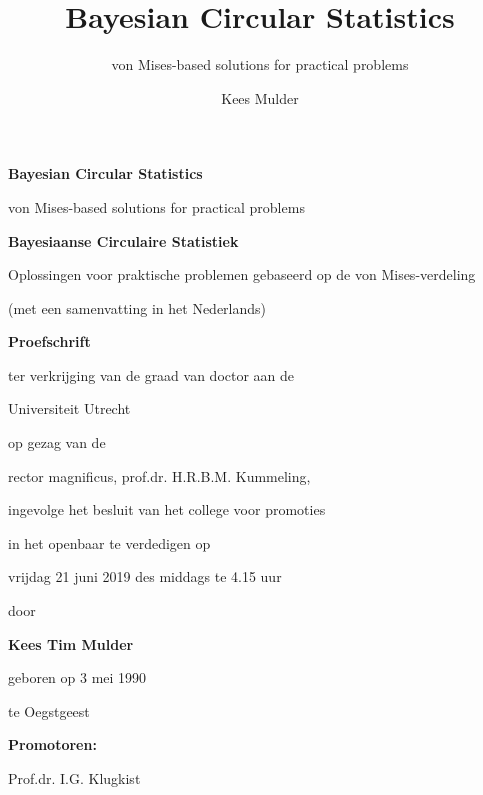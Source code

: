 \documentclass[12pt, a4paper]{book}\usepackage[]{graphicx}\usepackage{xcolor}
\title{Bayesian Circular Statistics}
\subtitle{von Mises-based solutions for practical problems}
\author{Kees Mulder}
\begin{document}
\frontmatter


\begin{center}
\huge{\textbf{Bayesian Circular Statistics}}

\Large{von Mises-based solutions for practical problems}

\vspace*{1cm}

\large{\textbf{Bayesiaanse Circulaire Statistiek}}

\normalsize{Oplossingen voor praktische problemen gebaseerd op de von Mises-verdeling}

\vspace*{.3cm}

\normalsize{(met een samenvatting in het Nederlands)}



\vspace*{2cm}

\Large{\textbf{Proefschrift}}

\vspace*{3cm}

\normalsize

ter verkrijging van de graad van doctor aan de

Universiteit Utrecht

op gezag van de

rector magnificus, prof.dr. H.R.B.M. Kummeling,

 ingevolge het besluit van het college voor promoties

in het openbaar te verdedigen op

\vspace*{.5cm}
vrijdag 21 juni 2019 des middags te 4.15 uur


\vspace*{1.5cm}

door


\vspace*{1.5cm}

\Large{\textbf{Kees Tim Mulder}}
\normalsize

\vspace*{1cm}

geboren op 3 mei 1990

te Oegstgeest

\end{center}


\newpage

\pagestyle{plain}
\textbf{Promotoren:}

Prof.dr. I.G. Klugkist
\end{document}
